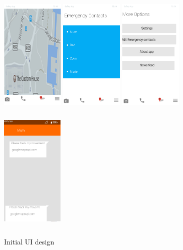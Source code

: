 \documentclass[a4paper]{report}
\begin{document}
\begin{figure}[h]
\centering
	\includegraphics[width=3cm, height=6cm]{homepage}
	\includegraphics[width=3cm, height=6cm]{emergencycontacts}
	\includegraphics[width=3cm, height=6cm]{morepage}
	\includegraphics[width=3cm, height=6cm]{textpage}
		\caption{Initial UI design}
		\label{fig:InitialUIdesign}
\end{figure}
\end{document}
